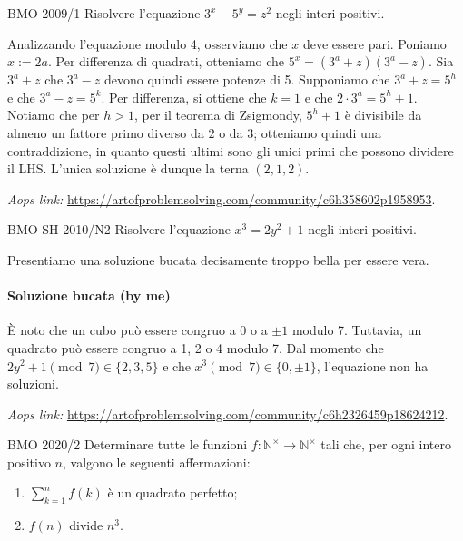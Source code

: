 \documentclass{article}
\begin{document}
\begin{proposition}{BMO 2009/1}{}
	Risolvere l'equazione $3^x-5^y=z^2$ negli interi positivi.
\end{proposition}

Analizzando l'equazione modulo 4, osserviamo che $x$ deve essere pari.
Poniamo $x:=2a$. Per differenza di quadrati, otteniamo che
$5^x=(3^a+z)(3^a-z)$. Sia $3^a+z$ che $3^a-z$ devono quindi essere
potenze di 5. Supponiamo che $3^a+z=5^h$ e che $3^a-z=5^k$.
Per differenza, si ottiene che $k=1$ e che $2\cdot 3^a=5^h+1$. Notiamo che
per $h>1$,
per il teorema di Zsigmondy, $5^h+1$ è divisibile da almeno un fattore primo
diverso da $2$ o da $3$; otteniamo quindi una contraddizione, in quanto
questi ultimi sono gli unici primi che possono dividere il LHS.
L'unica soluzione è dunque la terna $(2,1,2)$.

\vspace{0.5cm}
\textit{Aops link:}
\href{https://artofproblemsolving.com/community/c6h358602p1958953}
{https://artofproblemsolving.com/community/c6h358602p1958953}.

\begin{proposition}{BMO SH 2010/N2}{}
	Risolvere l'equazione $x^3=2y^2+1$ negli interi positivi.
\end{proposition}
Presentiamo una soluzione bucata decisamente troppo bella per essere vera.

\paragraph{Soluzione bucata (by me)}
È noto che un cubo può essere congruo a $0$ o a $\pm 1$ modulo 7.
Tuttavia, un quadrato può essere congruo a 1, 2 o 4 modulo 7.
Dal momento che $2y^2+1 \pmod{7} \in \{2,3,5 \}$ e che
$x^3 \pmod{7} \in \{ 0,\pm 1\}$, l'equazione non ha soluzioni.

\vspace{0.5cm}
\textit{Aops link:}
\href{https://artofproblemsolving.com/community/c6h2326459p18624212}
{https://artofproblemsolving.com/community/c6h2326459p18624212}.

\begin{proposition}{BMO 2020/2}{}
	Determinare tutte le funzioni
	$f:\mathbb{N^{\times}}\rightarrow\mathbb{N^{\times}}$ tali che, per ogni
	intero positivo $n$, valgono le seguenti affermazioni:
	\begin{enumerate}
		\item $ \sum_{k=1}^{n} f(k) $ è un quadrato perfetto;
		\item $f(n)$ divide $n^3$.
	\end{enumerate}
\end{proposition}
\end{document}
